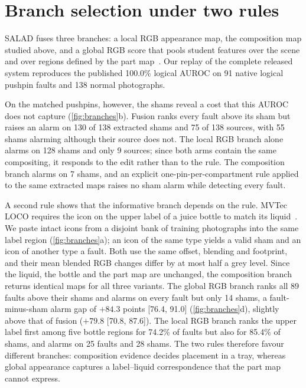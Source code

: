 \documentclass[10pt,twocolumn,letterpaper]{article}
\begin{document}
\section{Branch selection under two rules}
\label{sec:transfer}
SALAD fuses three branches: a local RGB appearance map, the composition map studied above, and a global RGB score that pools student features over the scene and over regions defined by the part map~\cite{fucka2025}. Our replay of the complete released system reproduces the published 100.0\% logical AUROC on 91 native logical pushpin faults and 138 normal photographs.

On the matched pushpins, however, the shams reveal a cost that this AUROC does not capture (\cref{fig:branches}b). Fusion ranks every fault above its sham but raises an alarm on 130 of 138 extracted shams and 75 of 138 sources, with 55 shams alarming although their source does not. The local RGB branch alone alarms on 128 shams and only 9 sources; since both arms contain the same compositing, it responds to the edit rather than to the rule. The composition branch alarms on 7 shams, and an explicit one-pin-per-compartment rule applied to the same extracted maps raises no sham alarm while detecting every fault.

A second rule shows that the informative branch depends on the rule. MVTec LOCO requires the icon on the upper label of a juice bottle to match its liquid~\cite{bergmann2022}. We paste intact icons from a disjoint bank of training photographs into the same label region (\cref{fig:branches}a); an icon of the same type yields a valid sham and an icon of another type a fault. Both use the same offset, blending and footprint, and their mean blended RGB changes differ by at most half a grey level. Since the liquid, the bottle and the part map are unchanged, the composition branch returns identical maps for all three variants. The global RGB branch ranks all 89 faults above their shams and alarms on every fault but only 14 shams, a fault-minus-sham alarm gap of $+84.3$ points [76.4, 91.0] (\cref{fig:branches}d), slightly above that of fusion ($+79.8$ [70.8, 87.6]). The local RGB branch ranks the upper label first among five bottle regions for 74.2\% of faults but also for 85.4\% of shams, and alarms on 25 faults and 28 shams. The two rules therefore favour different branches: composition evidence decides placement in a tray, whereas global appearance captures a label--liquid correspondence that the part map cannot express.
\end{document}
